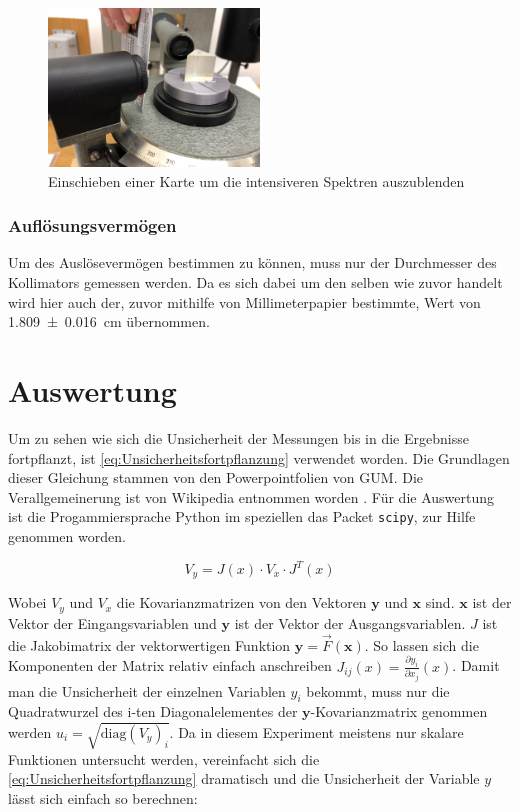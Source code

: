\documentclass[11pt,ngerman]{scrartcl}
\begin{document}
\begin{figure}[H]
	\begin{center}
		\includegraphics[width=0.5\textwidth]{abdecken}
	\end{center}
	\caption{Einschieben einer Karte um die intensiveren Spektren auszublenden}
	\label{fig:abdecken}
\end{figure}


\subsubsection{Auflösungsvermögen}

Um des Auslösevermögen bestimmen zu können, muss nur der Durchmesser des
Kollimators gemessen werden. Da es sich dabei um den selben wie zuvor handelt
wird hier auch der, zuvor mithilfe von Millimeterpapier bestimmte, Wert von
\SI{1.809(16)}{cm} übernommen.



\section{Auswertung}

\noindent Um zu sehen wie sich die Unsicherheit der Messungen bis in die
Ergebnisse fortpflanzt, ist \autoref{eq:Unsicherheitsfortpflanzung} verwendet
worden. Die Grundlagen dieser Gleichung stammen von den Powerpointfolien von
GUM.\cite{WolfgangKessel2004} Die Verallgemeinerung ist von Wikipedia entnommen
worden \cite{2020Fehler}. Für die Auswertung ist die Progammiersprache Python
im speziellen das Packet \verb#scipy#, zur Hilfe genommen worden.

\begin{equation}
	\label{eq:Unsicherheitsfortpflanzung}
	V_y = J(x) \cdot V_x \cdot J^{T}(x)
\end{equation}

\noindent Wobei $V_y$ und $V_x$ die Kovarianzmatrizen von den Vektoren $\bm{y}$ und $\bm{x}$ sind.
$\bm{x}$ ist der Vektor der Eingangsvariablen und $\bm{y}$ ist der Vektor der Ausgangsvariablen.
$J$ ist die Jakobimatrix der vektorwertigen Funktion $\bm{y} = \vec{F}(\bm{x})$.
So lassen sich die Komponenten der Matrix relativ einfach anschreiben $J_{ij}(x) = \frac{\partial{y_i}}{\partial{x_j}}(x)$.
Damit man die Unsicherheit der einzelnen Variablen $y_i$ bekommt, muss nur die Quadratwurzel des i-ten Diagonalelementes der
$\bm{y}$-Kovarianzmatrix genommen werden $u_i= \sqrt{\mathrm{diag}(V_y)_i}$.
Da in diesem Experiment meistens nur skalare Funktionen untersucht werden, vereinfacht
sich die \autoref{eq:Unsicherheitsfortpflanzung} dramatisch und die Unsicherheit
der Variable $y$ lässt sich einfach so berechnen:
\end{document}
